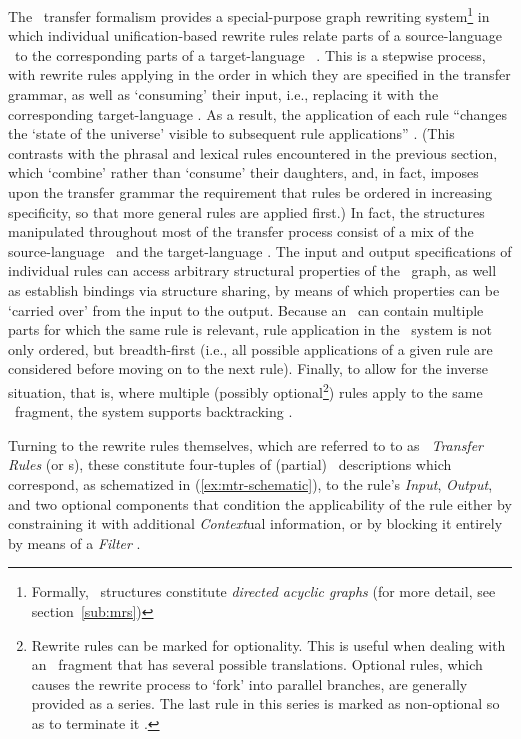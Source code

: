 The \logon\ transfer formalism provides a special-purpose graph rewriting
system\footnote{Formally, \mrs\ structures constitute \emph{directed acyclic
graphs} (for more detail, see section~\ref{sub:mrs})} in which individual
unification-based rewrite rules relate parts of a source-language \mrs\ to the
corresponding parts of a target-language \mrs\ \citep{oepen2008transfer}. This
is a stepwise process, with rewrite rules applying in the order in which they
are specified in the transfer grammar, as well as `consuming' their input,
i.e., replacing it with the corresponding target-language \mrs. As a result,
the application of each rule ``changes the `state of the universe' visible to
subsequent rule applications'' \citep{oepen2008transfer}. (This contrasts with
the phrasal and lexical rules encountered in the previous section, which
`combine' rather than `consume' their daughters, and, in fact, imposes upon the
transfer grammar the requirement that rules be ordered in increasing
specificity, so that more general rules are applied first.) In fact, the
structures manipulated throughout most of the transfer process consist of a mix
of the source-language \mrs\ and the target-language \mrs. The input and output
specifications of individual rules can access arbitrary structural properties
of the \mrs\ graph, as well as establish bindings via structure sharing, by
means of which properties can be `carried over' from the input to the output.
Because an \mrs\ can contain multiple parts for which the same rule is
relevant, rule application in the \logon\ system is not only ordered, but
breadth-first (i.e., all possible applications of a given rule are considered
before moving on to the next rule). Finally, to allow for the inverse
situation, that is, where multiple (possibly optional\footnote{Rewrite rules
can be marked for optionality. This is useful when dealing with an \mrs\
fragment that has several possible translations. Optional rules, which causes
the rewrite process to `fork' into parallel branches, are generally provided as
a series. The last rule in this series is marked as non-optional so as to
terminate it \citep{oepen2008transfer}.}) rules apply to the same \mrs\
fragment, the system supports backtracking \citep{oepen2008transfer}.

Turning to the rewrite rules themselves, which are referred to to as
\emph{\mrs\ Transfer Rules} (or \mtr s), these constitute four-tuples of
(partial) \mrs\ descriptions which correspond, as schematized in
(\ref{ex:mtr-schematic}), to the rule's \emph{Input}, \emph{Output}, and
two optional components that condition the applicability of the rule either by
constraining it with additional \emph{Context}ual information, or by blocking
it entirely by means of a \emph{Filter} \citep{oepen2008transfer}.


